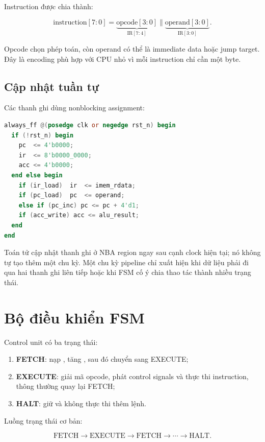 \documentclass[12pt,a4paper]{article}
\newcommand{\code}[1]{\texttt{\detokenize{#1}}}
\begin{document}
Instruction được chia thành:

\[
\text{instruction}[7:0]
= \underbrace{\text{opcode}[3:0]}_{\text{IR}[7:4]}
\parallel
\underbrace{\text{operand}[3:0]}_{\text{IR}[3:0]}.
\]

Opcode chọn phép toán, còn operand có thể là immediate data hoặc jump
target. Đây là encoding phù hợp với CPU nhỏ vì mỗi instruction chỉ cần
một byte.

\subsection{Cập nhật tuần tự}

Các thanh ghi dùng nonblocking assignment:

\begin{lstlisting}[language=Verilog]
always_ff @(posedge clk or negedge rst_n) begin
  if (!rst_n) begin
    pc  <= 4'b0000;
    ir  <= 8'b0000_0000;
    acc <= 4'b0000;
  end else begin
    if (ir_load)  ir  <= imem_rdata;
    if (pc_load)  pc  <= operand;
    else if (pc_inc) pc <= pc + 4'd1;
    if (acc_write) acc <= alu_result;
  end
end
\end{lstlisting}

Toán tử \code{<=} cập nhật thanh ghi ở NBA region ngay sau cạnh clock
hiện tại; nó không tự tạo thêm một chu kỳ. Một chu kỳ pipeline chỉ xuất
hiện khi dữ liệu phải đi qua hai thanh ghi liên tiếp hoặc khi FSM cố ý
chia thao tác thành nhiều trạng thái.

\section{Bộ điều khiển FSM}

Control unit có ba trạng thái:

\begin{enumerate}[noitemsep]
  \item \textbf{FETCH}: nạp \code{IR <- imem_rdata}, tăng
        \code{PC <- PC + 1}, sau đó chuyển sang EXECUTE;
  \item \textbf{EXECUTE}: giải mã opcode, phát control signals và thực thi
        instruction, thông thường quay lại FETCH;
  \item \textbf{HALT}: giữ \code{halted=1} và không thực thi thêm lệnh.
\end{enumerate}

Luồng trạng thái cơ bản:

\[
\text{FETCH} \rightarrow \text{EXECUTE}
\rightarrow \text{FETCH} \rightarrow \cdots
\rightarrow \text{HALT}.
\]
\end{document}
